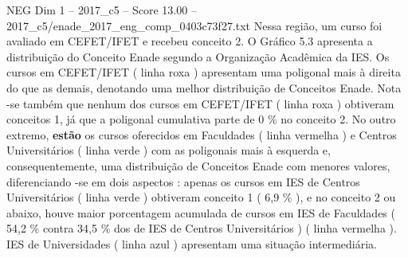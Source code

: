 \begin{textsample}{NEG Dim 1 – 2017\_c5 – Score 13.00 – 2017\_c5/enade\_2017\_eng\_comp\_0403c73f27.txt}
Nessa região, um curso foi avaliado em CEFET/IFET e recebeu conceito 2.
O Gráfico 5.3 apresenta a distribuição do Conceito Enade segundo a Organização Acadêmica da IES.
Os cursos em CEFET/IFET ( linha roxa ) apresentam uma poligonal mais à direita do que as demais, denotando uma melhor distribuição de Conceitos Enade.
Nota -se também que nenhum dos cursos em CEFET/IFET ( linha roxa ) obtiveram conceitos 1, já que a poligonal cumulativa parte de 0 \% no conceito 2.
No outro extremo, \textbf{estão} os cursos oferecidos em Faculdades ( linha vermelha ) e Centros Universitários ( linha verde ) com as poligonais mais à esquerda e, consequentemente, uma distribuição de Conceitos Enade com menores valores, diferenciando -se em dois aspectos : apenas os cursos em IES de Centros Universitários ( linha verde ) obtiveram conceito 1 ( 6,9 \% ), e no conceito 2 ou abaixo, houve maior porcentagem acumulada de cursos em IES de Faculdades ( 54,2 \% contra 34,5 \% dos de IES de Centros Universitários ) ( linha vermelha ).
IES de Universidades ( linha azul ) apresentam uma situação intermediária.

\end{textsample}

